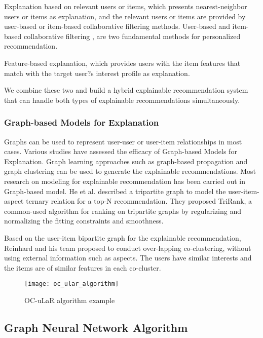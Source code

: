\par Explanation based on relevant users or items, which presents nearest-neighbor users or items as explanation, and the relevant users or items are provided by user-based or item-based collaborative filtering methods. User-based and item-based collaborative filtering \cite{sarwar2001item}, \cite{cleger2012top} are two fundamental methods for personalized recommendation.
\par Feature-based explanation, which provides users with the item features that match with the target user?s interest profile as explanation.
\par We combine these two and build a hybrid explainable recommendation system that can handle both types of explainable recommendations simultaneously.

\subsubsection{Graph-based Models for Explanation}
Graphs can be used to represent user-user or user-item relationships in most cases. Various studies have assessed the efficacy of Graph-based Models for Explanation. Graph learning approaches such as graph-based propagation and graph clustering can be used to generate the explainable recommendations. Most research on modeling for explainable recommendation has been carried out in Graph-based model. He et al.\cite{he2015trirank} described a tripartite graph to model the user-item-aspect ternary relation for a top-N recommendation. They proposed TriRank, a common-used algorithm for ranking on tripartite graphs by regularizing and normalizing the fitting constraints and smoothness.
\par Based on the user-item bipartite graph for the explainable recommendation, Reinhard and his team \cite{heckel2017scalable} proposed to conduct over-lapping co-clustering, without using external information such as aspects. The users have similar interests and the items are of similar features in each co-cluster. 

\begin{figure}[h]
\caption{OC-uLaR algorithm example\cite{heckel2017scalable}}
\label{figure:2-1}
\centering
\texttt{[image: oc\_ular\_algorithm]}
\end{figure}

\subsection{Graph Neural Network Algorithm}
